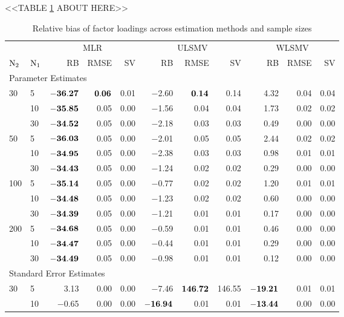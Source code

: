 \documentclass[Review,sageh,times, doublespace]{sagej}
\begin{document}
<<TABLE \ref{tb:bias-fct} ABOUT HERE>>
\begin{table}[!htp]
\centering
\begin{threeparttable}
\caption{Relative bias of factor loadings across estimation methods and sample sizes} 
\label{tb:bias-fct}
\begin{tabular}{llrrrrrrrrr}
  \toprule
  &   & \multicolumn{3}{c}{MLR} & \multicolumn{3}{c}{ULSMV} & \multicolumn{3}{c}{WLSMV}\\ \cmidrule(lr){3-5} \cmidrule(lr){6-8} \cmidrule(lr){9-11}
$\rm N_2$ & $\rm N_1$ & RB & RMSE & SV & RB & RMSE & SV & RB & RMSE & SV \\ 
  \midrule
\multicolumn{11}{l}{Parameter Estimates}\\
30 & 5 & $\bf -36.27$ & $\bf 0.06$ & 0.01 & $-$2.60 & $\bf0.14$ & 0.14 & 4.32 & 0.04 & 0.04 \\ 
   & 10 & $\bf -35.85$ & 0.05 & 0.00 & $-$1.56 & 0.04 & 0.04 & 1.73 & 0.02 & 0.02 \\ 
   & 30 & $\bf -34.52$ & 0.05 & 0.00 & $-$2.18 & 0.03 & 0.03 & 0.49 & 0.00 & 0.00 \\ 
  50 & 5 & $\bf -36.03$ & 0.05 & 0.00 & $-$2.01 & 0.05 & 0.05 & 2.44 & 0.02 & 0.02 \\ 
   & 10 & $\bf -34.95$ & 0.05 & 0.00 & $-$2.38 & 0.03 & 0.03 & 0.98 & 0.01 & 0.01 \\ 
   & 30 & $\bf -34.43$ & 0.05 & 0.00 & $-$1.24 & 0.02 & 0.02 & 0.29 & 0.00 & 0.00 \\ 
  100 & 5 & $\bf -35.14$ & 0.05 & 0.00 & $-$0.77 & 0.02 & 0.02 & 1.20 & 0.01 & 0.01 \\ 
   & 10 & $\bf -34.48$ & 0.05 & 0.00 & $-$1.23 & 0.02 & 0.02 & 0.60 & 0.00 & 0.00 \\ 
   & 30 & $\bf -34.39$ & 0.05 & 0.00 & $-$1.21 & 0.01 & 0.01 & 0.17 & 0.00 & 0.00 \\ 
  200 & 5 & $\bf -34.68$ & 0.05 & 0.00 & $-$0.59 & 0.01 & 0.01 & 0.46 & 0.00 & 0.00 \\ 
   & 10 & $\bf -34.47$ & 0.05 & 0.00 & $-$0.44 & 0.01 & 0.01 & 0.29 & 0.00 & 0.00 \\ 
   & 30 & $\bf -34.49$ & 0.05 & 0.00 & $-$0.98 & 0.01 & 0.01 & 0.12 & 0.00 & 0.00 \\ 
\multicolumn{11}{l}{Standard Error Estimates}\\
  30 & 5 & 3.13 & 0.00 & 0.00 & $-$7.46 & $\bf146.72$ & 146.55 & $\bf-19.21$ & 0.01 & 0.01 \\ 
   & 10 & $-$0.65 & 0.00 & 0.00 & $\bf-16.94$ & 0.01 & 0.01 & $\bf-13.44$ & 0.00 & 0.00 \\ 

\end{tabular}
\end{threeparttable}
\end{table}
\end{document}
